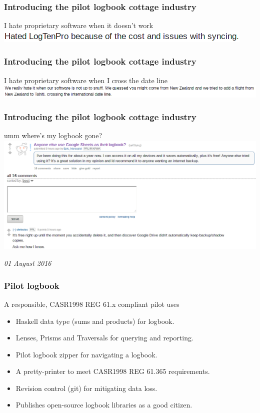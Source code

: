 \begin{frame}
\frametitle{Introducing the pilot logbook cottage industry}
\begin{block}{I hate proprietary software when it doesn't work}
\includegraphics[height=0.05\textheight]{image/logbook-5.png}
\end{block}
\end{frame}

\begin{frame}
\frametitle{Introducing the pilot logbook cottage industry}
\begin{block}{I hate proprietary software when I cross the date line}
\includegraphics[height=0.05\textheight]{image/logbook-6.png}
\end{block}
\end{frame}

\begin{frame}
\frametitle{Introducing the pilot logbook cottage industry}
\begin{block}{umm where's my logbook gone?}
\includegraphics[height=0.4\textheight]{image/logbook-7.png}
\end{block}
\par
\tiny{\emph{01 August 2016}}
\end{frame}

\begin{frame}
\frametitle{Pilot logbook}
\begin{block}{A responsible, CASR1998 REG 61.x compliant pilot uses}
\begin{itemize}
\item<1-> Haskell data type (sums and products) for logbook.
\item<1-> Lenses, Prisms and Traversals for querying and reporting.
\item<1-> Pilot logbook zipper for navigating a logbook.
\item<1-> A pretty-printer to meet CASR1998 REG 61.365 requirements.
\item<1-> Revision control (git) for mitigating data loss.
\item<1-> Publishes open-source logbook libraries as a good citizen.
\end{itemize}
\end{block}
\end{frame}

